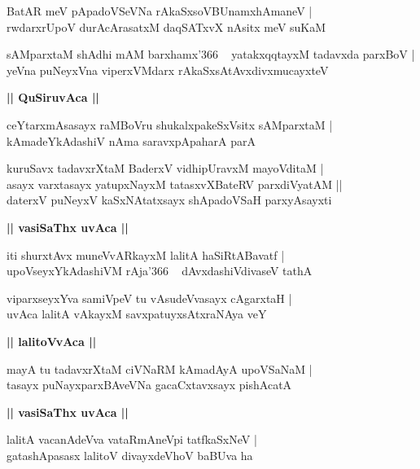 \documentclass[twoside,12pt,openright]{book}
\newcounter{shloka}[chapter]
\def\uvaca#1{\centerline{{\large\textbf{#1}}}}
\begin{document}
\begin{shloka}%
BatAR meV pApadoVSeVNa rAkaSxsoVBUnamxhAmaneV |\\
rwdarxrUpoV durAcArasatxM daqSATxvX nAsitx meV suKaM
\end{shloka}

\begin{shloka}%
sAMparxtaM shAdhi mAM barxhamx\char'366 ~ yatakxqqtayxM tadavxda parxBoV |\\
yeVna puNeyxVna viperxVMdarx rAkaSxsAtAvxdivxmucayxteV
\end{shloka}

\uvaca{|| QuSiruvAca ||}

\begin{shloka}%
ceYtarxmAsasayx raMBoVru shukalxpakeSxVsitx sAMparxtaM |\\
kAmadeYkAdashiV nAma saravxpApaharA parA
\end{shloka}

\begin{shloka}%
kuruSavx tadavxrXtaM BaderxV vidhipUravxM mayoVditaM |\\
asayx varxtasayx yatupxNayxM tatasxvXBateRV parxdiVyatAM ||\\
daterxV puNeyxV kaSxNAtatxsayx shApadoVSaH parxyAsayxti
\end{shloka}

\uvaca{|| vasiSaThx uvAca ||}

\begin{shloka}%
iti shurxtAvx muneVvARkayxM lalitA haSiRtABavatf |\\
upoVseyxYkAdashiVM rAja\char'366 ~ dAvxdashiVdivaseV tathA 
\end{shloka}

\begin{shloka}%
viparxseyxYva samiVpeV tu vAsudeVvasayx cAgarxtaH |\\
uvAca lalitA vAkayxM savxpatuyxsAtxraNAya veY
\end{shloka}

\uvaca{|| lalitoVvAca ||}

\begin{shloka}%
mayA tu tadavxrXtaM ciVNaRM kAmadAyA upoVSaNaM |\\
tasayx puNayxparxBAveVNa gacaCxtavxsayx pishAcatA 
\end{shloka}

\uvaca{|| vasiSaThx uvAca ||}

\begin{shloka}%
lalitA vacanAdeVva vataRmAneVpi tatfkaSxNeV |\\
gatashApasasx lalitoV divayxdeVhoV baBUva ha 
\end{shloka}
\end{document}
